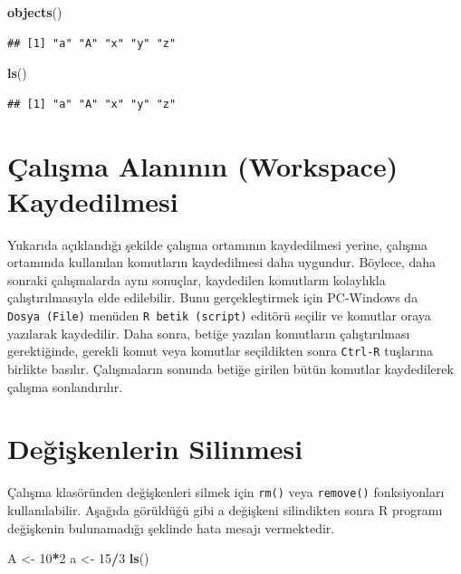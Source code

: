 \documentclass[
]{book}
\newenvironment{Shaded}{\begin{snugshade}}{\end{snugshade}}
\newcommand{\DecValTok}[1]{\textcolor[rgb]{0.00,0.00,0.81}{#1}}
\newcommand{\FunctionTok}[1]{\textcolor[rgb]{0.13,0.29,0.53}{\textbf{#1}}}
\newcommand{\NormalTok}[1]{#1}
\newcommand{\OtherTok}[1]{\textcolor[rgb]{0.56,0.35,0.01}{#1}}
\newcommand{\SpecialCharTok}[1]{\textcolor[rgb]{0.81,0.36,0.00}{\textbf{#1}}}
\begin{document}
\begin{Shaded}
\begin{Highlighting}[]
\FunctionTok{objects}\NormalTok{()}
\end{Highlighting}
\end{Shaded}

\begin{verbatim}
## [1] "a" "A" "x" "y" "z"
\end{verbatim}

\begin{Shaded}
\begin{Highlighting}[]
\FunctionTok{ls}\NormalTok{()}
\end{Highlighting}
\end{Shaded}

\begin{verbatim}
## [1] "a" "A" "x" "y" "z"
\end{verbatim}

\section{Çalışma Alanının (Workspace) Kaydedilmesi}\label{uxe7alux131ux15fma-alanux131nux131n-workspace-kaydedilmesi}

Yukarıda açıklandığı şekilde çalışma ortamının kaydedilmesi yerine, çalışma ortamında kullanılan komutların kaydedilmesi daha uygundur. Böylece, daha sonraki çalışmalarda aynı sonuçlar, kaydedilen komutların kolaylıkla çalıştırılmasıyla elde edilebilir. Bunu gerçekleştirmek için PC-Windows da \texttt{Dosya\ (File)} menüden \texttt{R\ betik\ (script)} editörü seçilir ve komutlar oraya yazılarak kaydedilir. Daha sonra, betiğe yazılan komutların çalıştırılması gerektiğinde, gerekli komut veya komutlar seçildikten sonra \texttt{Ctrl-R} tuşlarına birlikte basılır. Çalışmaların sonunda betiğe girilen bütün komutlar kaydedilerek çalışma sonlandırılır.

\section{Değişkenlerin Silinmesi}\label{deux11fiux15fkenlerin-silinmesi}

Çalışma klasöründen değişkenleri silmek için \texttt{rm()} veya \texttt{remove()} fonksiyonları kullanılabilir. Aşağıda görüldüğü gibi a değişkeni silindikten sonra R programı değişkenin bulunamadığı şeklinde hata mesajı vermektedir.

\begin{Shaded}
\begin{Highlighting}[]
\NormalTok{A }\OtherTok{\textless{}{-}} \DecValTok{10}\SpecialCharTok{*}\DecValTok{2} 
\NormalTok{a }\OtherTok{\textless{}{-}} \DecValTok{15}\SpecialCharTok{/}\DecValTok{3} 
\FunctionTok{ls}\NormalTok{()}
\end{Highlighting}
\end{Shaded}
\end{document}
